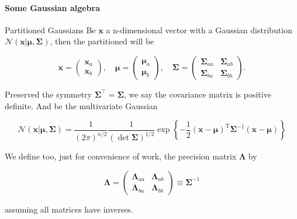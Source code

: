 \begin{frame}{\insertsection}
	\framesubtitle{Some Gaussian algebra}

	\begin{block}{Partitioned Gaussians}
		Be $\mathbf{x}$ a n-dimensional vector with a Gaussian distribution $\mathcal{N}\left( \mathbf{x} | \boldsymbol{\mu}, \boldsymbol{\Sigma} \right)$, then the partitioned will be
  
		\begin{equation*}
			\mathbf{x}=
			\begin{pmatrix}
			\mathbf{x}_a \\  
			\mathbf{x}_b 
			\end{pmatrix}
			,\quad 
			\boldsymbol{\mu}=
			\begin{pmatrix}
			\boldsymbol{\mu}_a \\
			\boldsymbol{\mu}_b
			\end{pmatrix}
			,\quad 
			\boldsymbol{\Sigma}=
			\begin{pmatrix}
			\boldsymbol{\Sigma}_{aa} & \boldsymbol{\Sigma}_{ab}  \\
			\boldsymbol{\Sigma}_{ba} & \boldsymbol{\Sigma}_{bb}
			\end{pmatrix}
			.
		\end{equation*}

		Preserved the symmetry $\boldsymbol{\Sigma}^\top = \boldsymbol{\Sigma}$, we say the covariance matrix is positive definite. And be the multivariate Gaussian

		\begin{equation*}
			\mathcal{N}(\mathbf{x} | \boldsymbol{\mu}, \boldsymbol{\Sigma})=\frac{1}{(2 \pi)^{n / 2}} \frac{1}{ \left( \det \boldsymbol{\Sigma} \right) ^{1 / 2}} \exp \left\{-\frac{1}{2}(\mathbf{x}-\boldsymbol{\mu})^{\mathrm{T}} \boldsymbol{\Sigma}^{-1}(\mathbf{x}-\boldsymbol{\mu})\right\}
		\end{equation*}

		We define too, just for convenience of work, the precision matrix $\boldsymbol{\Lambda}$ by

		\begin{equation*}
			\boldsymbol{\Lambda} = 
			\begin{pmatrix}
			\boldsymbol{\Lambda}_{aa} & \boldsymbol{\Lambda}_{ab}  \\
			\boldsymbol{\Lambda}_{ba} & \boldsymbol{\Lambda}_{bb}
			\end{pmatrix} 
			\equiv \boldsymbol{\Sigma}^{-1}
		\end{equation*}

		assuming all matrices have inverses.
	\end{block}
\end{frame}

